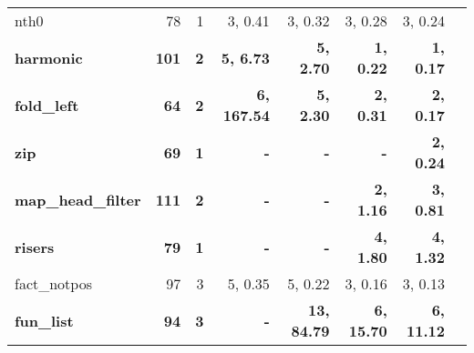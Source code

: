 \begin{table}
\begin{center}
\begin{tabular}{|l|r|r|r|r|r|r|r|}
 nth0              &  78 & 1 & 3, 0.41 & 3, 0.32 & 3, 0.28 & 3, 0.24 \\
\bf  harmonic          &\bf  101 &\bf  2 &\bf  5, 6.73 &\bf  5, 2.70 &\bf  1, 0.22 &\bf  1, 0.17 \\
\bf  fold\_left        &\bf   64 &\bf  2 &\bf  6, 167.54 &\bf  5, 2.30 &\bf  2, 0.31 &\bf  2, 0.17 \\
\bf  zip               &\bf   69 &\bf  1 &\bf  - &\bf  - &\bf  - &\bf  2, 0.24 \\
\bf  map\_head\_filter &\bf  111 &\bf  2 &\bf  - &\bf  - &\bf  2, 1.16 &\bf  3, 0.81 \\
\bf  risers            &\bf   79 &\bf  1 &\bf  - &\bf  - &\bf  4, 1.80 &\bf  4, 1.32 \\
 fact\_notpos      &  97 & 3 & 5, 0.35 & 5, 0.22 & 3, 0.16 & 3, 0.13 \\
\bf  fun\_list         &\bf    94&\bf  3 &\bf  - &\bf  13, 84.79 &\bf  6, 15.70 &\bf  6, 11.12 \\
\hline
\end{tabular}
\end{center}
\end{table}

